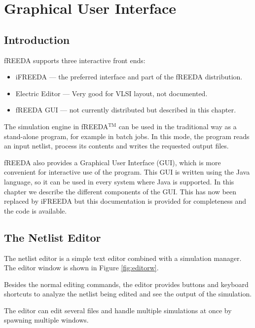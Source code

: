 \chapter{Graphical User Interface} \label{ch_gui}

\section{Introduction}

fREEDA supports three interactive front ends:
\begin{itemize}
\item iFREEDA --- the preferred interface and part of the fREEDA distribution.
\item Electric Editor --- Very good for VLSI layout, not documented.
\item fREEDA GUI --- not currently distributed but described in this chapter.
\end{itemize}

The simulation engine in fREEDA${^\mathrm{TM}}$ can be used in the traditional way as
a stand-alone program, for example in batch jobs. In this mode, the
program reads an input netlist, process its contents and writes the
requested output files.

fREEDA also provides a Graphical User Interface (GUI), which is more
convenient for interactive use of the program. This GUI is written
using the Java language, so it can be used in every system where Java
is supported. In this chapter we describe the different components of
the GUI. This has now been replaced by iFREEDA but this documentation is provided for completeness and the code is available.

\section{The Netlist Editor}

The netlist editor is a simple text editor combined with a simulation
manager. The editor window is shown in Figure \ref{fig:editorw}.
%
\begin{figure*}
\centerline{\epsfxsize=10cm }
\caption{Netlist Editor window.} \label{fig:editorw}
\end{figure*}
%
Besides the normal editing commands, the editor provides buttons and
keyboard shortcuts to analyze the netlist being edited and see the
output of the simulation.

The editor can edit several files and handle multiple simulations at
once by spawning multiple windows.

